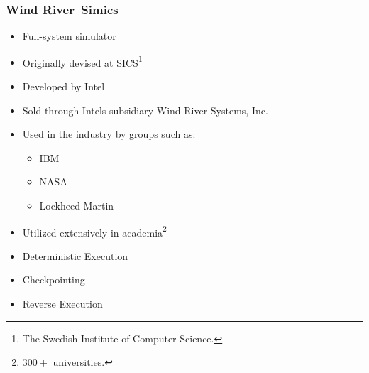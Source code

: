 
\begin{frame}[allowframebreaks]

\frametitle{Wind River\texttrademark\ Simics\texttrademark }

\begin{itemize}
	\item Full-system simulator
	\item Originally devised at SICS\footnote{The Swedish Institute of Computer Science.}
	\item Developed by Intel\textregistered 
	\item Sold through Intels subsidiary Wind River Systems, Inc.
	\item Used in the industry by groups such as:
	\begin{itemize}
		\item IBM
		\item NASA
		\item Lockheed Martin
	\end{itemize}
	\item Utilized extensively in academia\footnote{$300+$ universities.}
\end{itemize}

\framebreak 

\begin{itemize}
	\item Deterministic Execution
	\item Checkpointing
	\item Reverse Execution
\end{itemize}

\end{frame}
